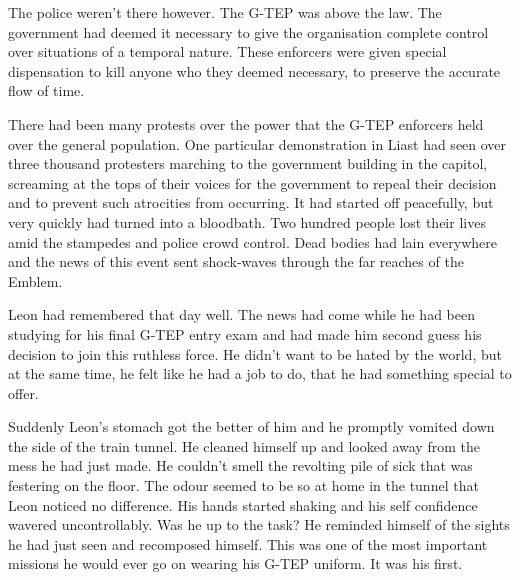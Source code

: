 The police weren't there however.  The G-TEP was above the law.  The government had deemed it necessary to give the organisation complete control over situations of a temporal nature.  These enforcers were given special dispensation to kill anyone who they deemed necessary, to preserve the accurate flow of time.  

There had been many protests over the power that the G-TEP enforcers held over the general population.  One particular demonstration in Liast had seen over three thousand protesters marching to the government building in the capitol, screaming at the tops of their voices for the government to repeal their decision and to prevent such atrocities from occurring.  It had started off peacefully, but very quickly had turned into a bloodbath.  Two hundred people lost their lives amid the stampedes and police crowd control.  Dead bodies had lain everywhere and the news of this event sent shock-waves through the far reaches of the Emblem.

Leon had remembered that day well.  The news had come while he had been studying for his final G-TEP entry exam and had made him second guess his decision to join this ruthless force.  He didn't want to be hated by the world, but at the same time, he felt like he had a job to do, that he had something special to offer.

Suddenly Leon's stomach got the better of him and he promptly vomited down the side of the train tunnel.  He cleaned himself up and looked away from the mess he had just made.  He couldn't smell the revolting pile of sick that was festering on the floor.  The odour seemed to be so at home in the tunnel that Leon noticed no difference.  His hands started shaking and his self confidence wavered uncontrollably.  Was he up to the task?  He reminded himself of the sights he had just seen and recomposed himself.  This was one of the most important missions he would ever go on wearing his G-TEP uniform.  It was his first.

